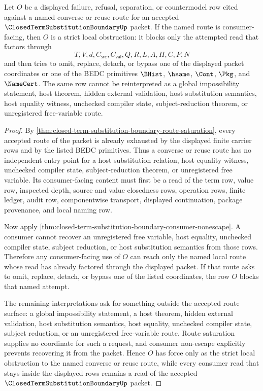 \begin{corollary}
\label{cor:closed-term-substitution-boundary-route-saturation-strict-obstruction}
Let $O$ be a displayed failure, refusal, separation, or countermodel row cited against a named converse or reuse route for an accepted $\ClosedTermSubstitutionBoundaryUp$ packet. If the named route is consumer-facing, then $O$ is a strict local obstruction: it blocks only the attempted read that factors through
$$
T,V,d,C_{\mathsf{src}},C_{\mathsf{val}},Q,R,L,A,H,C,P,N
$$
and then tries to omit, replace, detach, or bypass one of the displayed packet coordinates or one of the BEDC primitives $\BHist$, $\hsame$, $\Cont$, $\Pkg$, and $\NameCert$. The same row cannot be reinterpreted as a global impossibility statement, host theorem, hidden external validation, host substitution semantics, host equality witness, unchecked compiler state, subject-reduction theorem, or unregistered free-variable route.
\end{corollary}
\begin{proof}
By \autoref{thm:closed-term-substitution-boundary-route-saturation}, every accepted route of the packet is already exhausted by the displayed finite carrier rows and by the listed BEDC primitives. Thus a converse or reuse route has no independent entry point for a host substitution relation, host equality witness, unchecked compiler state, subject-reduction theorem, or unregistered free variable. Its consumer-facing content must first be a read of the term row, value row, inspected depth, source and value closedness rows, operation rows, finite ledger, audit row, componentwise transport, displayed continuation, package provenance, and local naming row.

Now apply \autoref{thm:closed-term-substitution-boundary-consumer-nonescape}. A consumer cannot recover an unregistered free variable, host equality, unchecked compiler state, subject reduction, or host substitution semantics from those rows. Therefore any consumer-facing use of $O$ can reach only the named local route whose read has already factored through the displayed packet. If that route asks to omit, replace, detach, or bypass one of the listed coordinates, the row $O$ blocks that named attempt.

The remaining interpretations ask for something outside the accepted route surface: a global impossibility statement, a host theorem, hidden external validation, host substitution semantics, host equality, unchecked compiler state, subject reduction, or an unregistered free-variable route. Route saturation supplies no coordinate for such a request, and consumer non-escape explicitly prevents recovering it from the packet. Hence $O$ has force only as the strict local obstruction to the named converse or reuse route, while every consumer read that stays inside the displayed rows remains a read of the accepted $\ClosedTermSubstitutionBoundaryUp$ packet.
\end{proof}
